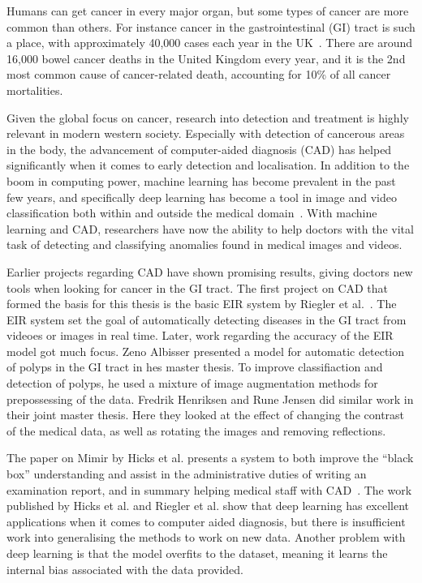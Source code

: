 Humans can get cancer in every major organ, but some types of cancer are more common than others.    
For instance cancer in the gastrointestinal (GI) tract is such a place, with approximately 40,000 cases each year in the UK~\cite{UKCancerBowel}. There are around 16,000 bowel cancer deaths in the United Kingdom every year, and it is the 2nd most common cause of cancer-related death, accounting for 10\% of all cancer mortalities.

Given the global focus on cancer, research into detection and treatment is highly relevant in modern western society. 
Especially with detection of cancerous areas in the body, the advancement of computer-aided diagnosis (CAD) has helped significantly when it comes to early detection and localisation. In addition to the boom in computing power, machine learning has become prevalent in the past few years, and specifically deep learning has become a tool in image and video classification both within and outside the medical domain~\cite{NIPS2012_4824,DBLP:journals/corr/SimonyanZ14a,DBLP:journals/corr/SimonyanZ14a,DBLP:journals/corr/HeZRS15,DBLP:journals/corr/SzegedyIV16}. 
With machine learning and CAD, researchers have now the ability to help doctors with the vital task of detecting and classifying anomalies found in medical images and videos.

Earlier projects regarding CAD have shown promising results, giving doctors new tools when looking for cancer in the GI tract.
The first project on CAD that formed the basis for this thesis is the basic EIR system by Riegler et al.~\cite{riegler2016eir}.  The EIR system set the goal of automatically detecting diseases in the GI tract from videoes or images in real time. 
Later, work regarding the accuracy of the EIR model got much focus. Zeno Albisser presented a model for automatic detection of polyps in the GI tract in hes master thesis. To improve classifiaction and detection of polyps, he used a mixture of image augmentation methods for prepossessing of the data. 
Fredrik Henriksen and Rune Jensen did similar work in their joint master thesis. Here they looked at the effect of changing the contrast of the medical data, as well as rotating the images and removing reflections.


The paper on Mimir by Hicks et al. presents a system to both improve the ``black box'' understanding and assist in the administrative duties of writing an examination report, and in summary helping medical staff with CAD~\cite{25953}. 
The work published by Hicks et al. and Riegler et al. show that deep learning has excellent applications when it comes to computer aided diagnosis, but there is insufficient work into generalising the methods to work on new data. Another problem with deep learning is that the model overfits to the dataset, meaning it learns the internal bias associated with the data provided. 

